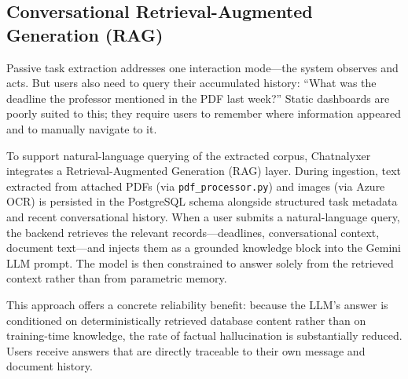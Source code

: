 \subsection{Conversational Retrieval-Augmented Generation (RAG)}
\label{subsec:rag_architecture}

Passive task extraction addresses one interaction mode—the system observes and acts. But users also need to query their accumulated history: ``What was the deadline the professor mentioned in the PDF last week?'' Static dashboards are poorly suited to this; they require users to remember where information appeared and to manually navigate to it.

To support natural-language querying of the extracted corpus, Chatnalyxer integrates a Retrieval-Augmented Generation (RAG) layer. During ingestion, text extracted from attached PDFs (via \texttt{pdf\_processor.py}) and images (via Azure OCR) is persisted in the PostgreSQL schema alongside structured task metadata and recent conversational history. When a user submits a natural-language query, the backend retrieves the relevant records—deadlines, conversational context, document text—and injects them as a grounded knowledge block into the Gemini LLM prompt. The model is then constrained to answer solely from the retrieved context rather than from parametric memory.

This approach offers a concrete reliability benefit: because the LLM's answer is conditioned on deterministically retrieved database content rather than on training-time knowledge, the rate of factual hallucination is substantially reduced. Users receive answers that are directly traceable to their own message and document history.
